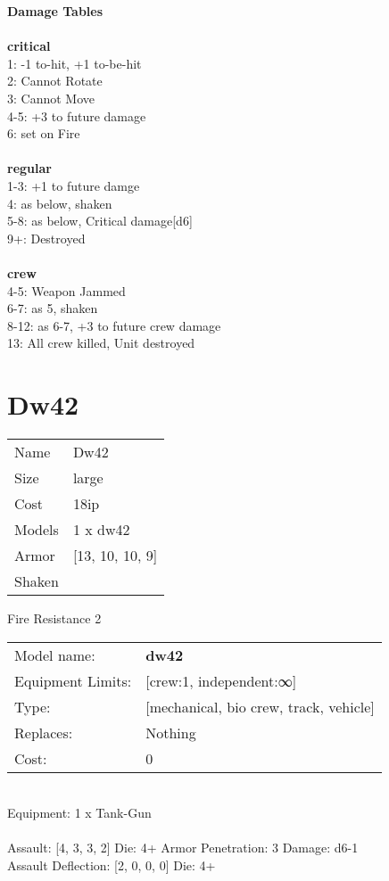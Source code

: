 {\bf Damage Tables} \\
\ \\ {\bf critical } \\
1: -1 to-hit, +1 to-be-hit \\
2: Cannot Rotate \\
3: Cannot Move \\
4-5: +3 to future damage \\
6: set on Fire \\
\ \\ {\bf regular } \\
1-3: +1 to future damge \\
4: as below, shaken \\
5-8: as below, Critical damage[d6] \\
9+: Destroyed \\
\ \\ {\bf crew } \\
4-5: Weapon Jammed \\
6-7: as 5, shaken \\
8-12: as 6-7, +3 to future crew damage \\
13: All crew killed, Unit destroyed \\










\pagebreak\pagebreak

\section{ Dw42 }

\begin{tabular}{ll}
  Name & Dw42 \\
  Size & large\\
  Cost & 18ip\\
  Models & 1 x dw42\\
  Armor & [13, 10, 10, 9]\\
  Shaken & \\
\end{tabular}

\noindent Fire Resistance 2\\ 


\noindent
\begin{tabular}{ll}
Model name: &{\bf dw42 } \\
Equipment Limits: &[crew:1, independent:∞] \\
Type: &[mechanical, bio crew, track, vehicle] \\
Replaces: &Nothing \\
Cost: & 0\\
\end{tabular}
\ \\
Equipment: 1 x Tank-Gun \\
\ \\
Assault: [4, 3, 3, 2] Die: 4+ Armor Penetration: 3 Damage: d6-1 \\
Assault Deflection: [2, 0, 0, 0] Die: 4+\\
\indent  
\ \\

